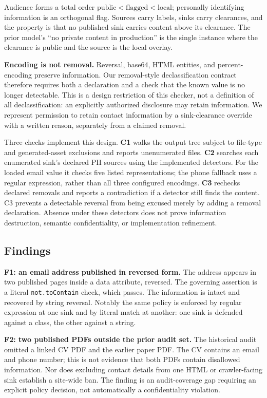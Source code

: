 \documentclass[acmsmall,screen,review,anonymous,nonacm]{acmart}
\newcommand{\code}[1]{\texttt{\small #1}}
\begin{document}
Audience forms a total order $\mathrm{public} < \mathrm{flagged} < \mathrm{local}$; personally identifying information is an orthogonal flag. Sources carry labels, sinks carry clearances, and the property is that no published sink carries content above its clearance. The prior model's ``no private content in production'' is the single instance where the clearance is public and the source is the local overlay.

\textbf{Encoding is not removal.} Reversal, base64, HTML entities, and percent-encoding preserve information. Our removal-style declassification contract therefore requires both a declaration and a check that the known value is no longer detectable. This is a design restriction of this checker, not a definition of all declassification: an explicitly authorized disclosure may retain information. We represent permission to retain contact information by a sink-clearance override with a written reason, separately from a claimed removal.

Three checks implement this design. \textbf{C1} walks the output tree subject to file-type and generated-asset exclusions and reports unenumerated files. \textbf{C2} searches each enumerated sink's declared PII sources using the implemented detectors. For the loaded email value it checks five listed representations; the phone fallback uses a regular expression, rather than all three configured encodings. \textbf{C3} rechecks declared removals and reports a contradiction if a detector still finds the content. C3 prevents a detectable reversal from being excused merely by adding a removal declaration. Absence under these detectors does not prove information destruction, semantic confidentiality, or implementation refinement.

\subsection{Findings}
\textbf{F1: an email address published in reversed form.} The address appears in two published pages inside a data attribute, reversed. The governing assertion is a literal \code{not.toContain} check, which passes. The information is intact and recovered by string reversal. Notably the same policy is enforced by regular expression at one sink and by literal match at another: one sink is defended against a class, the other against a string.

\textbf{F2: two published PDFs outside the prior audit set.} The historical audit omitted a linked CV PDF and the earlier paper PDF. The CV contains an email and phone number; this is not evidence that both PDFs contain disallowed information. Nor does excluding contact details from one HTML or crawler-facing sink establish a site-wide ban. The finding is an audit-coverage gap requiring an explicit policy decision, not automatically a confidentiality violation.
\end{document}
